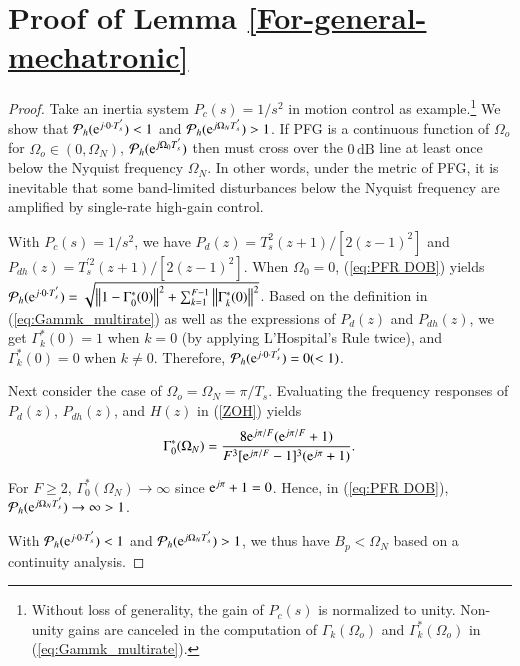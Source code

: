 \documentclass [11pt, proquest] {uwthesis}[2020/02/24]
\begin{document}
\section{Proof of Lemma \mbox{\ref{For-general-mechatronic}}} \label{chapA:Proof-of-Lemma-5}
\begin{proof}
Take an inertia system $P_{c}(s)=1/s^{2}$ in motion control as example.\footnote{Without loss of generality, the gain of $P_{c}(s)$ is normalized
to unity. Non-unity gains are canceled in the computation of $\Gamma_{k}(\Omega_{o})$
and $\Gamma_{k}^{*}(\Omega_{o})$ in (\ref{eq:Gammk_multirate}).} We show that $\mathcal{P}_{h}(\mathrm{e}^{j\cdot0\cdot T_{s}^{'}})<1$ and
$\mathcal{P}_{h}(\mathrm{e}^{j\Omega_{N}T_{s}^{'}})>1$. If PFG is a continuous
function of $\Omega_{o}$ for $\Omega_{o}\in(0,\Omega_{N})$, $\mathcal{P}_{h}(\mathrm{e}^{j\Omega_{0}T_{s}^{'}})$
then must cross over the $0\,\text{dB}$ line at least once below
the Nyquist frequency $\Omega_{N}$. In other words, under the metric
of PFG, it is inevitable that some band-limited disturbances below
the Nyquist frequency are amplified by single-rate high-gain control.

With $P_{c}(s)=1/s^{2}$, we have $P_{d}(z)=T_{s}^{2}(z+1)/\left[2(z-1)^{2}\right]$
and $P_{dh}(z)=T_{s}^{'2}(z+1)/\left[2(z-1)^{2}\right]$. When $\Omega_{0}=0$,
(\ref{eq:PFR DOB}) yields $\mathcal{P}_{h}(\mathrm{e}^{j\cdot0\cdot T_{s}^{'}})=\sqrt{\left\Vert 1-\Gamma_{0}^{*}(0)\right\Vert ^{2}+\sum_{k=1}^{F-1}\left\Vert \Gamma_{k}^{*}(0)\right\Vert ^{2}}$.
Based on the definition in (\ref{eq:Gammk_multirate}) as well as
the expressions of $P_{d}(z)$ and $P_{dh}(z)$, we get $\Gamma_{k}^{*}(0)=1$
when $k=0$ (by applying L\textquoteright Hospital\textquoteright s
Rule twice), and $\Gamma_{k}^{*}(0)=0$ when $k\neq0$. Therefore,
$\mathcal{P}_{h}(\mathrm{e}^{j\cdot0\cdot T_{s}^{'}})=0(<1)$. 

Next consider the case of $\Omega_{o}=\Omega_{N}=\pi/T_{s}$. Evaluating
the frequency responses of $P_{d}(z)$, $P_{dh}(z)$, and $H(z)$
in (\ref{ZOH}) yields
\begin{equation}
\Gamma_{0}^{*}(\Omega_{N})=\frac{8\mathrm{e}^{j\pi/F}(\mathrm{e}^{j\pi/F}+1)}{F^{3}[\mathrm{e}^{j\pi/F}-1]^{3}(\mathrm{e}^{j\pi}+1)}.\label{eq:gammak_omegaN}
\end{equation}

For $F\geqslant2$, $\Gamma_{0}^{*}(\Omega_{N})\rightarrow\infty$
since $\mathrm{e}^{j\pi}+1=0$. Hence, in (\ref{eq:PFR DOB}), $\mathcal{P}_{h}(\mathrm{e}^{j\Omega_{N}T_{s}^{'}})\rightarrow\infty>1$.

With $\mathcal{P}_{h}(\mathrm{e}^{j\cdot0\cdot T_{s}^{'}})<1$ and $\mathcal{P}_{h}(\mathrm{e}^{j\Omega_{N}T_{s}^{'}})>1$,
we thus have $B_{p}<\Omega_{N}$ based on a continuity analysis. %

\end{proof}
\end{document}
